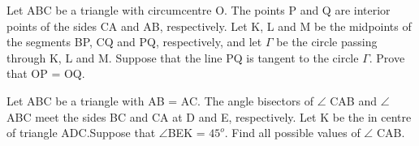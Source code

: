 \item Let ABC be a triangle with circumcentre O. The points P and Q are interior points of the sides CA and AB, respectively. Let K, L and M be the midpoints of the segments BP, CQ and PQ, respectively, and let $\Gamma$ be the circle passing through K, L and M. Suppose that the line PQ is tangent to the circle $\Gamma$. Prove that OP = OQ.

\item Let ABC be a triangle with AB = AC. The angle bisectors of $\angle$ CAB and $\angle$ ABC meet the sides BC and CA at D and E, respectively. Let K be the in centre of triangle ADC.Suppose that $\angle$BEK = $45^{o}$. Find all possible values of $\angle$ CAB.
